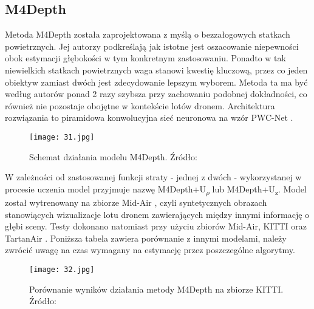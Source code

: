 \subsection{M4Depth}
Metoda M4Depth \cite{fonder2023technique} została zaprojektowana z myślą o bezzałogowych statkach powietrznych. Jej autorzy podkreślają jak istotne jest oszacowanie niepewności obok estymacji głębokości w tym konkretnym zastosowaniu. Ponadto w tak niewielkich statkach powietrznych waga stanowi kwestię kluczową, przez co jeden obiektyw zamiast dwóch jest zdecydowanie lepszym wyborem. Metoda ta ma być według autorów ponad 2 razy szybsza przy zachowaniu podobnej dokładności, co również nie pozostaje obojętne w kontekście lotów dronem. Architektura rozwiązania to piramidowa konwolucyjna sieć neuronowa na wzór PWC-Net \cite{sun2018pwcnet}.
\begin{figure}[H]
    \centering
    \texttt{[image: 31.jpg]}
    \caption{Schemat działania modelu M4Depth. Źródło: \cite{fonder2023technique}}
    \label{fig:m4d-schema}
\end{figure}
W zależności od zastosowanej funkcji straty - jednej z dwóch - wykorzystanej w procesie uczenia model przyjmuje nazwę M4Depth+U\textsubscript{$\rho$} lub M4Depth+U\textsubscript{z}.
Model został wytrenowany na zbiorze Mid-Air \cite{fonder2019midair}, czyli syntetycznych obrazach stanowiących wizualizacje lotu dronem zawierających między innymi informację o głębi sceny. Testy dokonano natomiast przy użyciu zbiorów Mid-Air, KITTI oraz TartanAir \cite{wang2020tartanair}. Poniższa tabela zawiera porównanie z innymi modelami, należy zwrócić uwagę na czas wymagany na estymację przez poszczególne algorytmy.
\begin{figure}[H]
    \centering
    \texttt{[image: 32.jpg]}
    \caption{Porównanie wyników działania metody M4Depth na zbiorze KITTI. Źródło: \cite{fonder2023technique}}
    \label{fig:m4d-comparison}
\end{figure}

